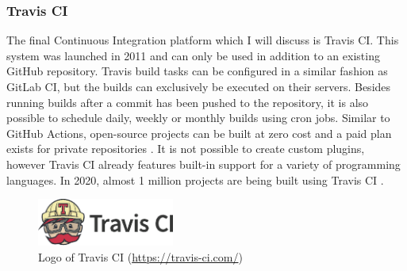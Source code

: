 
\subsubsection{Travis CI}
The final Continuous Integration platform which I will discuss is Travis CI. This \CI{} system was launched in 2011 and can only be used in addition to an existing GitHub repository. Travis build tasks can be configured in a similar fashion as GitLab CI, but the builds can exclusively be executed on their servers. Besides running builds after a commit has been pushed to the repository, it is also possible to schedule daily, weekly or monthly builds using cron jobs. Similar to GitHub Actions, open-source projects can be built at zero cost and a paid plan exists for private repositories \cite{travisanalysis}. It is not possible to create custom plugins, however Travis CI already features built-in support for a variety of programming languages. In 2020, almost 1 million projects are being built using Travis CI \cite{travis2020}.

\begin{figure}[htbp!]
	\centering
	\includegraphics[width=0.40\textwidth]{assets/travis-ci.pdf}
	\caption{Logo of Travis CI (\url{https://travis-ci.com/})}
	\label{fig:travis-ci}
\end{figure}
